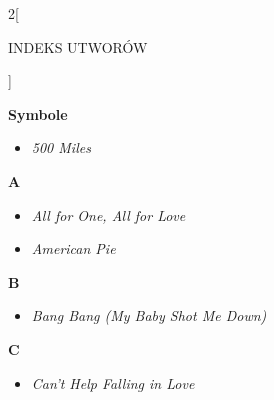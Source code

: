 \documentclass[a4paper]{report}
\begin{document}
\begin{multicols*}{2}[\begin{Huge}INDEKS UTWORÓW\end{Huge}\vspace{1cm}]\begin{minipage}{\columnwidth}
	\begin{Large}
		\textbf{Symbole}
	\end{Large} 
	\begin{itemize}[topsep=6pt, after=\vspace{5mm}, leftmargin=0mm]
		\itemsep0em
		\item[]\textit{500 Miles}  \\
	\end{itemize}
\end{minipage}
\begin{minipage}{\columnwidth}
\begin{Large}
		\textbf{A}
	\end{Large} 
	\begin{itemize}[topsep=6pt, after=\vspace{5mm}, leftmargin=0mm]
		\itemsep0em
		\item[]\textit{All for One, All for Love}  \\
		\item[]  \textit{American Pie}  \\
	\end{itemize}
\end{minipage}
\begin{minipage}{\columnwidth}
\begin{Large}
		\textbf{B}
	\end{Large} 
	\begin{itemize}[topsep=6pt, after=\vspace{5mm}, leftmargin=0mm]
		\itemsep0em
		\item[]\textit{Bang Bang (My Baby Shot Me Down)}  \\
	\end{itemize}
\end{minipage}
\begin{minipage}{\columnwidth}
\begin{Large}
		\textbf{C}
	\end{Large} 
	\begin{itemize}[topsep=6pt, after=\vspace{5mm}, leftmargin=0mm]
		\itemsep0em
		\item[]\textit{Can't Help Falling in Love}  \\

\end{itemize}
\end{minipage}
\end{multicols*}
\end{document}
